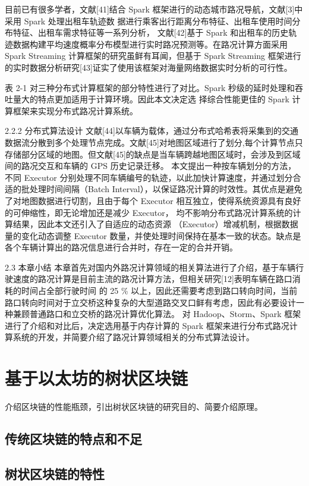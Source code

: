 目前已有很多学者，文献[41]结合 Spark 框架进行的动态城市路况导航，文献[3]中采用 Spark 处理出租车轨迹数 据进行乘客出行距离分布特征、出租车使用时间分布特征、出租车需求特征等一系列分析， 文献[42]基于 Spark 和出租车的历史轨迹数据构建平均速度概率分布模型进行实时路况预测等。在路况计算方面采用 Spark Streaming 计算框架的研究虽鲜有耳闻，但基于 Spark Streaming 框架进行的实时数据分析研究[43]证实了使用该框架对海量网络数据实时分析的可行性。

表 2-1 对三种分布式计算框架的部分特性进行了对比。Spark 秒级的延时处理和吞吐量大的特点更加适用于计算环境。因此本文决定选 择综合性能更佳的 Spark 计算框架来实现分布式路况计算系统。



2.2.2 分布式算法设计
文献[44]以车辆为载体，通过分布式哈希表将采集到的交通数据流分散到多个处理节点完成。文献[45]对地图区域进行了划分,每个计算节点只存储部分区域的地图。但文献[45]的缺点是当车辆跨越地图区域时，会涉及到区域间的路况交互和车辆的 GPS 历史记录迁移。
本文提出一种按车辆划分的方法，不同 Executor 分别处理不同车辆编号的轨迹，以此加快计算速度，并通过划分合适的批处理时间间隔（Batch Interval），以保证路况计算的时效性。其优点是避免了对地图数据进行切割，且由于每个 Executor 相互独立，使得系统资源具有良好的可伸缩性，即无论增加还是减少 Executor， 均不影响分布式路况计算系统的计算结果，因此本文还引入了自适应的动态资源 （Executor）增减机制，根据数据量的变化动态调整 Executor 数量，并使处理时间保持在基本一致的状态。缺点是各个车辆计算出的路况信息进行合并时，存在一定的合并开销。

2.3 本章小结
本章首先对国内外路况计算领域的相关算法进行了介绍，基于车辆行驶速度的路况计算是目前主流的路况计算方法，但相关研究[12]表明车辆在路口消耗的时间占全部行驶时间 的 25 \% 以上，因此还需要考虑到路口转向时间，当前路口转向时间对于立交桥这种复杂的大型道路交叉口鲜有考虑，因此有必要设计一种兼顾普通路口和立交桥的路况计算优化算法。
对 Hadoop、Storm、Spark 框架进行了介绍和对比后，决定选用基于内存计算的 Spark 框架来进行分布式路况计算系统的开发，并简要介绍了路况计算领域相关的分布式算法设计。



\section{基于以太坊的树状区块链}
介绍区块链的性能瓶颈，引出树状区块链的研究目的、简要介绍原理。
\subsection{传统区块链的特点和不足}
\subsection{树状区块链的特性}

